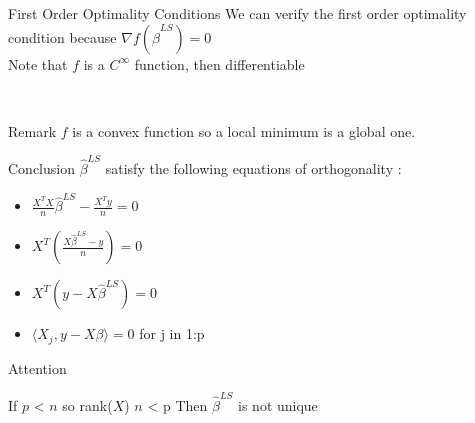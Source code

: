 \documentclass[unknownkeysallowed]{beamer}
\begin{document}
\begin{frame}
\begin{alertblock}{First Order Optimality Conditions}
We can verify the first order optimality condition because $\nabla{f(\hat\beta^{LS})}=0$
\\
Note that $f$ is a $C^{\infty}$ function, then differentiable

\end{alertblock}
 
\\\begin{block}{Remark}
$f$ is a convex function so a local minimum is a global one. 
\end{block}
 
\begin{block}{Conclusion}
$\hat\beta^{LS}$ satisfy the following equations of orthogonality :
\begin{itemize}
        \item $\frac{X^TX}{n}\hat\beta^{LS}-\frac{X^Ty}{n}=0$
        \item \iff $X^T(\frac{X\hat\beta^{LS}-y}{n})=0$
        \item \iff $X^T(y-X\hat\beta^{LS})=0$
        \item \iff $\langle X_{j},y-X\beta\rangle=0$ for j in 1:p
    \end{itemize}


\end{block}

\newpage

\begin{block}{Attention}

If $p$ < $n$ so rank($X$) \leq $n$ < p Then $\hat\beta^{LS}$ is not unique 

\end{block}

    
\end{frame}
\end{document}
